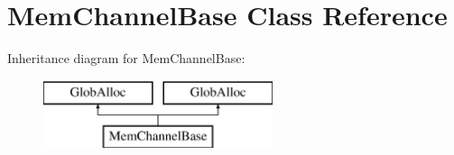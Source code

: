 \hypertarget{classMemChannelBase}{\section{Mem\-Channel\-Base Class Reference}
\label{classMemChannelBase}
}
Inheritance diagram for Mem\-Channel\-Base\-:\begin{figure}[H]
\begin{center}
\leavevmode
\includegraphics[height=2.000000cm]{classMemChannelBase}
\end{center}
\end{figure}
